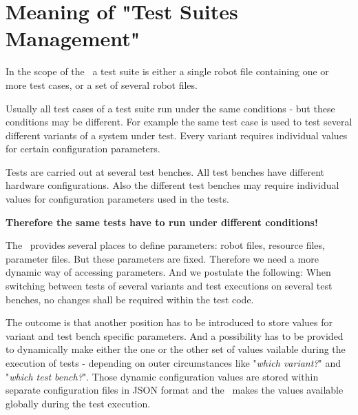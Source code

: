 %



%

\section{Meaning of "Test Suites Management"}

In the scope of the \rfwcore\ a test suite is either a single robot file containing one or more test cases, or a set of several robot files.

Usually all test cases of a test suite run under the same conditions - but these conditions may be different. For example the same test case is used
to test several different variants of a system under test. Every variant requires individual values for certain configuration parameters.

Tests are carried out at several test benches. All test benches have different hardware configurations.
Also the different test benches may require individual values for configuration parameters used in the tests.

\textbf{Therefore the same tests have to run under different conditions!}

The \rfwcore\ provides several places to define parameters: robot files, resource files, parameter files. But these parameters
are fixed. Therefore we need a more dynamic way of accessing parameters. And we postulate the following: When switching between
tests of several variants and test executions on several test benches, no changes shall be required within the test code.

The outcome is that another position has to be introduced to store values for variant and test bench specific parameters.
And a possibility has to be provided to dynamically make either the one or the other set of values vailable during the execution of
tests - depending on outer circumstances like "\textit{which variant?}" and "\textit{which test bench?}".
Those dynamic configuration values are stored within separate configuration files in JSON format and the \pkg\ makes the values
available globally during the test execution.

